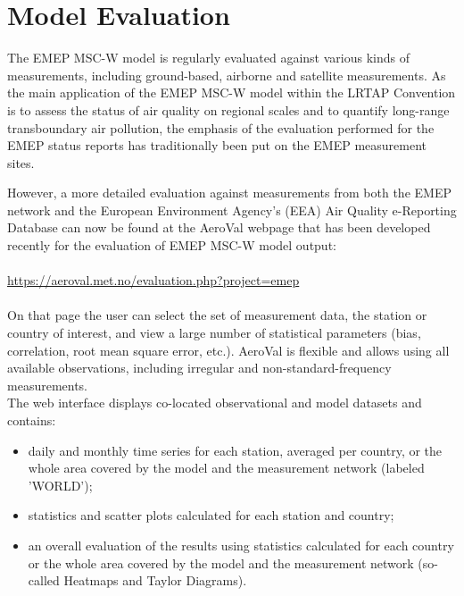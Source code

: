 \setcounter{page}{1}

\cleardoublepage
\chapter[2019 Model Evaluation]{Model Evaluation}
\label{ch:appx_modeleval}


The EMEP MSC-W model is regularly evaluated against various kinds of measurements, including ground-based, airborne and satellite measurements.
As the main application of the EMEP MSC-W model within the LRTAP Convention is to assess the status of air quality on regional scales and to quantify long-range transboundary air pollution, the emphasis of the evaluation performed for the EMEP status reports has traditionally been put on the EMEP measurement sites.

However, a more detailed evaluation against measurements from both the EMEP network and the European Environment Agency's (EEA) Air Quality e-Reporting Database can now be found at the AeroVal webpage that has been developed recently for the evaluation
of EMEP MSC-W model output:\\
\\
\url{https://aeroval.met.no/evaluation.php?project=emep}\\
\\
On that page the user can select the set of measurement data, the
station or country of interest, and view a large number of statistical
parameters (bias, correlation, root mean square error, etc.). AeroVal is flexible and allows using all available observations, including irregular and non-standard-frequency measurements.
\\
The web interface displays co-located observational and model datasets
and contains:
\begin{itemize}

\item daily and monthly time series for each station, averaged per
  country, or the whole area covered by the model and
  the measurement network (labeled 'WORLD');
\item statistics and scatter plots calculated for each station and country;
\item an overall evaluation of the results using statistics calculated for
  each country or the whole area covered by the model and the measurement
  network (so-called Heatmaps and Taylor Diagrams).
\end{itemize}

